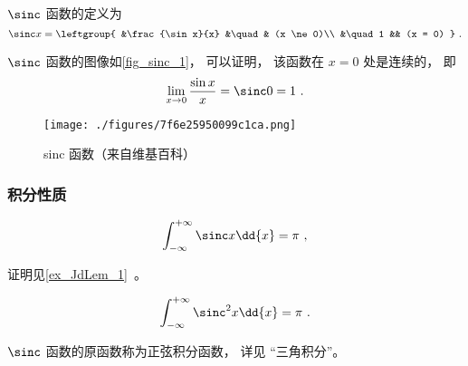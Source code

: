 

$\sinc$ 函数的定义为
\begin{equation}
\sinc x = 
\leftgroup{
&\frac{\sin x}{x} &\quad & (x \ne 0)\\
&\quad 1 && (x = 0)
}~.\end{equation}

$\sinc$ 函数的图像如\autoref{fig_sinc_1}， 可以证明， 该函数在 $x=0$ 处是连续的， 即
\begin{equation}
\lim_{x \to 0}\frac{\sin x}{x} = \sinc 0 = 1~.
\end{equation}

\begin{figure}[ht]
\centering
\texttt{[image: ./figures/7f6e25950099c1ca.png]}
\caption{sinc 函数（来自维基百科）} \label{fig_sinc_1}
\end{figure}

\subsubsection{积分性质}
\begin{equation}\label{eq_sinc_2}
\int_{-\infty}^{+\infty} \sinc x \dd{x} = \pi~,
\end{equation}

证明见\autoref{ex_JdLem_1}~。

\begin{equation}\label{eq_sinc_1}
\int_{-\infty}^{+\infty} \sinc^2 x \dd{x} = \pi~.
\end{equation}

$\sinc$ 函数的原函数称为正弦积分函数， 详见 “三角积分”。
